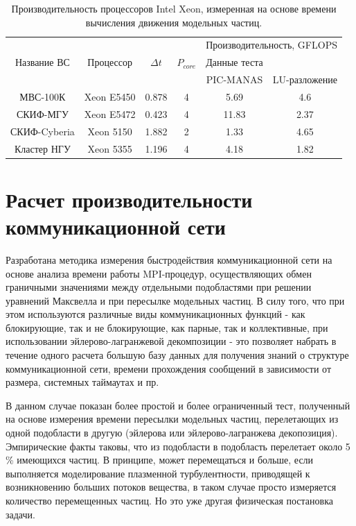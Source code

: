 \begin{table}[ht]
	\caption{Производительность процессоров Intel Xeon, измеренная на основе времени вычисления движения модельных частиц.}
	\label{PIC_vs_PROC_RAM}
	\begin{tabular}{|c|c|c|c|c|c|}
		\hline
		&            &            &             &       \multicolumn{2}{|c|}{Производительность, GFLOPS} \\ \cline{5-6}  	
		Название ВС  & Процессор  &  $\Delta t$ &$P_{core}$ & Данные теста  &  \\
		             &            &             &           & PIC-MANAS     & LU-разложение \\ \hline
		МВС-100К     & Xeon E5450 &  0.878      & 4     & 5.69           & 4.6     \\ \hline 
		СКИФ-МГУ     & Xeon E5472 &  0.423      & 4     & 11.83          & 2.37       \\ \hline     
		СКИФ-Cyberia & Xeon 5150  &  1.882      & 2     &  1.33          & 4.65    \\ \hline
		Кластер НГУ  & Xeon 5355  &  1.196      & 4     & 4.18           & 1.82       \\ \hline
	\end{tabular}	
\end{table}






\section{Расчет производительности коммуникационной сети}
\label{perfCommNet}
Разработана методика измерения быстродействия коммуникационной сети на основе анализа времени работы MPI-процедур, осуществляющих обмен граничными значениями между отдельными подобластями при решении уравнений Максвелла и при пересылке модельных частиц. В силу того, что при этом используются различные виды коммуникационных функций  - как блокирующие, так и не блокирующие, как парные, так и коллективные, при использовании эйлерово-лагранжевой декомпозиции - это позволяет набрать в течение одного расчета большую базу данных для получения знаний о структуре коммуникационной сети, времени прохождения сообщений в зависимости от размера, системных таймаутах и пр. 

В данном случае показан более простой и более ограниченный тест, полученный на основе измерения времени пересылки модельных частиц, перелетающих из одной подобласти в другую (эйлерова или эйлерово-лагранжева декопозиция). Эмпирические факты таковы, что из подобласти в подобласть перелетает около 5 \% имеющихся частиц. В принципе, может перемещаться и больше, если выполняется моделирование плазменной турбулентности, приводящей к возникновению больших потоков вещества, в таком случае просто измеряется количество перемещенных частиц. Но это уже другая физическая постановка задачи.

